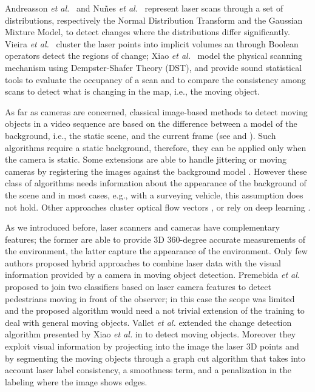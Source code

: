 Andreasson \emph{et al.}~\cite{andreasson2007has} and Nu{\~n}es \emph{et al.}~\cite{nunez2010change} represent laser scans through a set of distributions, respectively the Normal Distribution Transform and the Gaussian Mixture Model, to detect changes where the distributions differ significantly. 
Vieira \emph{et al.}~\cite{vieira2014spatial} cluster the laser points into implicit volumes an through Boolean operators detect the regions of change;
Xiao \emph{et al.}~\cite{xiao2013change} model the physical scanning mechanism using Dempster-Shafer Theory (DST), and provide sound statistical tools to evaluate the occupancy of a scan and to compare the consistency among scans to detect what is changing in the map, i.e., the moving object. %

As far as cameras are concerned, classical image-based methods to detect moving objects in a video sequence are based on the difference between a model of the background, i.e., the static scene, and the current frame (see \cite{Piccardi2004background} and \cite{Sobral2014}). 
Such algorithms require a static background, therefore, they can be applied only when the camera is static. 
Some extensions are able to handle jittering or moving cameras by registering the images against the background model \cite{azzari2005effective,romanoni2014background,kim2013detection,shakeri2014detection}.
However these class of algorithms needs information about the appearance of the background of the scene and in most cases, e.g., with a surveying vehicle, this assumption does not hold. 
Other approaches cluster optical flow vectors \cite{markovic2014moving}, or rely on deep learning \cite{lin2014deep}.

As we introduced before, laser scanners and cameras have complementary features; the former are able to provide 3D 360-degree accurate measurements of the environment, the latter capture the appearance of the environment. Only few authors proposed hybrid approaches to combine laser data with the visual information provided by a camera in moving object detection.
Premebida \emph{et al.} \cite{premebida2009lidar} proposed to join two classifiers based on laser camera features to detect pedestrians moving in front of the observer; in this case the scope was limited and the proposed algorithm would need a not trivial extension of the training to deal with general moving objects.
Vallet \emph{et al.} \cite{vallet2015extracting} extended the change detection algorithm presented by Xiao \emph{et al.} in \cite{xiao2013change} to detect moving objects. Moreover they exploit visual information by projecting into the image the laser 3D points and by segmenting the moving objects through a graph cut algorithm that takes into account laser label consistency, a smoothness term, and a penalization in the labeling where the image shows edges. 

